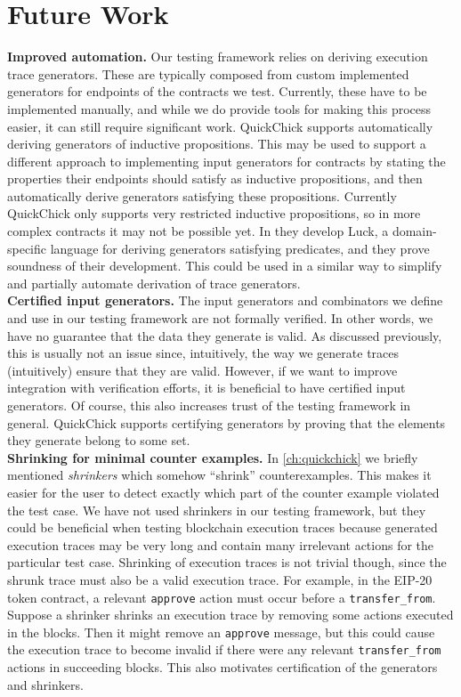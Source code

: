 \documentclass[twoside,11pt,openright]{report}
\newcommand{\coq}[1]{\texttt{#1}}
\begin{document}
\chapter{Future Work}
\label{ch:future-work}
\textbf{Improved automation.} Our testing framework relies on deriving execution trace generators. These are typically composed from custom implemented generators for endpoints of the contracts we test. Currently, these have to be implemented manually, and while we do provide tools for making this process easier, it can still require significant work. QuickChick supports automatically deriving generators of inductive propositions. This may be used to support a different approach to implementing input generators for contracts by stating the properties their endpoints should satisfy as inductive propositions, and then automatically derive generators satisfying these propositions. Currently QuickChick only supports very restricted inductive propositions, so in more complex contracts it may not be possible yet. In \cite{lampropoulos2016beginners} they develop Luck, a domain-specific language for deriving generators satisfying predicates, and they prove soundness of their development. This could be used in a similar way to simplify and partially automate derivation of trace generators.
\medskip\\
\textbf{Certified input generators.} The input generators and combinators we define and use in our testing framework are not formally verified. In other words, we have no guarantee that the data they generate is valid. As discussed previously, this is usually not an issue since, intuitively, the way we generate traces (intuitively) ensure that they are valid. However, if we want to improve integration with verification efforts, it is beneficial to have certified input generators. Of course, this also increases trust of the testing framework in general. QuickChick supports certifying generators by proving that the elements they generate belong to some set.
\medskip\\
\textbf{Shrinking for minimal counter examples.} In \autoref{ch:quickchick} we briefly mentioned \textit{shrinkers} which somehow ``shrink'' counterexamples. This makes it easier for the user to detect exactly which part of the counter example violated the test case. We have not used shrinkers in our testing framework, but they could be beneficial when testing blockchain execution traces because generated execution traces may be very long and contain many irrelevant actions for the particular test case. Shrinking of execution traces is not trivial though, since the shrunk trace must also be a valid execution trace. For example, in the EIP-20 token contract, a relevant \coq{approve} action must occur before a \coq{transfer\_from}. Suppose a shrinker shrinks an execution trace by removing some actions executed in the blocks. Then it might remove an \coq{approve} message, but this could cause the execution trace to become invalid if there were any relevant \coq{transfer\_from} actions in succeeding blocks. This also motivates certification of the generators and shrinkers.
\end{document}
